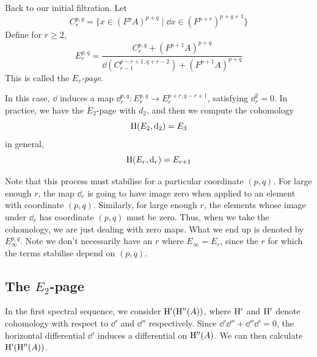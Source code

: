 \documentclass{article}
\begin{document}
Back to our initial filtration. Let
\[C^{p,q}_r = \{x \in (F^pA)^{p + q} \mid \dd x \in (F^{p+r})^{p+q+1}\}\]
Define for \(r \ge 2\),
\[E^{p,q}_r = \frac{C_r^{p, q} + (F^{p+1}A)^{p+q}}{\dd(C^{p-r+1,q+r-2}_{r-1}) + (F^{p+1}A)^{p+q}}\]
This is called the \emph{\(E_r\)-page}.

\lec

In this case, \(\dd\) induces a map \(\dd_r^{p,q} : E_r^{p, q} \to E_r^{p+r, q-r+1}\), satisfying \(\dd_r^2 = 0\). In practice, we have the \(E_2\)-page with \(d_2\), and then we compute the cohomology
\[\mathrm{H}(E_2, \dd_2) = E_3\]
in general,
\[\mathrm{H}(E_r, \dd_r) = E_{r+1}\]

Note that this process must stabilise for a particular coordinate \((p, q)\). For large enough \(r\), the map \(\dd_r\) is going to have image zero when applied to an element with coordinate \((p, q)\). Similarly, for large enough \(r\), the elements whose image under \(\dd_r\) has coordinate \((p, q)\) must be zero. Thus, when we take the cohomology, we are just dealing with zero maps. What we end up is denoted by \(E^{p, q}_\infty\). Note we don't necessarily have an \(r\) where \(E_\infty = E_r\), since the \(r\) for which the terms stabilise depend on \((p, q)\).

\subsection{The \(E_2\)-page}

In the first spectral sequence, we consider \(\mathrm{H}'(\mathrm{H}''(A))\), where \(\mathrm{H}'\) and \(\mathrm{H}'\) denote cohomology with respect to \(\dd'\) and \(\dd''\) respectively. Since \(\dd' \dd'' + \dd'' \dd' = 0\), the horizontal differential \(\dd'\) induces a differential on \(\mathrm{H}''(A)\). We can then calculate \(\mathrm{H}'(\mathrm{H}''(A))\).
\end{document}
